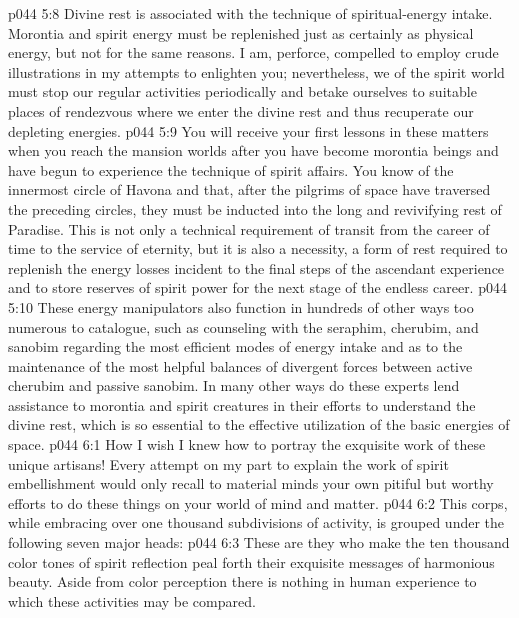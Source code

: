 \pc \vs p044 5:8 \bibnobreakspace {} Divine rest is associated with the technique of spiritual\hyp{}energy intake. Morontia and spirit energy must be replenished just as certainly as physical energy, but not for the same reasons. I am, perforce, compelled to employ crude illustrations in my attempts to enlighten you; nevertheless, we of the spirit world must stop our regular activities periodically and betake ourselves to suitable places of rendezvous where we enter the divine rest and thus recuperate our depleting energies.
\vs p044 5:9 You will receive your first lessons in these matters when you reach the mansion worlds after you have become morontia beings and have begun to experience the technique of spirit affairs. You know of the innermost circle of Havona and that, after the pilgrims of space have traversed the preceding circles, they must be inducted into the long and revivifying rest of Paradise. This is not only a technical requirement of transit from the career of time to the service of eternity, but it is also a necessity, a form of rest required to replenish the energy losses incident to the final steps of the ascendant experience and to store reserves of spirit power for the next stage of the endless career.
\vs p044 5:10 These energy manipulators also function in hundreds of other ways too numerous to catalogue, such as counseling with the seraphim, cherubim, and sanobim regarding the most efficient modes of energy intake and as to the maintenance of the most helpful balances of divergent forces between active cherubim and passive sanobim. In many other ways do these experts lend assistance to morontia and spirit creatures in their efforts to understand the divine rest, which is so essential to the effective utilization of the basic energies of space.
\vs p044 6:1 How I wish I knew how to portray the exquisite work of these unique artisans! Every attempt on my part to explain the work of spirit embellishment would only recall to material minds your own pitiful but worthy efforts to do these things on your world of mind and matter.
\vs p044 6:2 This corps, while embracing over one thousand subdivisions of activity, is grouped under the following seven major heads:
\pc \vs p044 6:3 \bibnobreakspace {} These are they who make the ten thousand color tones of spirit reflection peal forth their exquisite messages of harmonious beauty. Aside from color perception there is nothing in human experience to which these activities may be compared.
